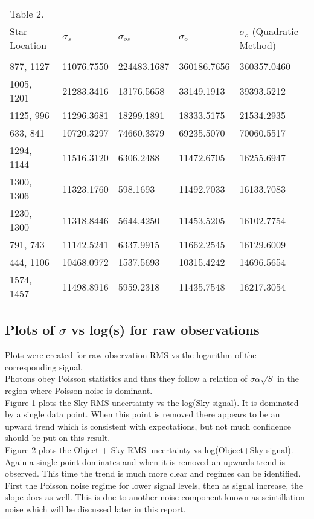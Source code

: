 \documentclass{article}
\begin{document}
\begin{table}[h]
\begin{tabular}{lllll}
Table 2. & & & &\\
Star Location & $\sigma _s$ & $\sigma _{os}$ & $\sigma _o$ & $\sigma _o$ (Quadratic Method) \\
\hline \\
877, 1127 & 11076.7550 & 224483.1687 & 360186.7656 & 360357.0460 \\
1005, 1201 & 21283.3416 & 13176.5658 & 33149.1913 & 39393.5212 \\
1125, 996 & 11296.3681 & 18299.1891 & 18333.5175 & 21534.2935 \\
633, 841 & 10720.3297 & 74660.3379 & 69235.5070 & 70060.5517 \\
1294, 1144 & 11516.3120 & 6306.2488 & 11472.6705 & 16255.6947 \\
1300, 1306 & 11323.1760 & 598.1693 & 11492.7033 & 16133.7083 \\
1230, 1300 & 11318.8446 & 5644.4250 & 11453.5205 & 16102.7754 \\
791, 743 & 11142.5241 & 6337.9915 & 11662.2545 & 16129.6009 \\
444, 1106 & 10468.0972 & 1537.5693 & 10315.4242 & 14696.5654 \\
1574, 1457 & 11498.8916 & 5959.2318 & 11435.7548 & 16217.3054 
\end{tabular}
\end{table}

\subsection{Plots of $\sigma$ vs log(s) for raw observations}
Plots were created for raw observation RMS vs the logarithm of the corresponding signal.\\

Photons obey Poisson statistics and thus they follow a relation of $\sigma \alpha \sqrt{S}$ in the region where Poisson noise is dominant.\\

Figure 1 plots the Sky RMS uncertainty vs the log(Sky signal). It is dominated by a single data point. When this point is removed there appears to be an upward trend which is consistent with expectations, but not much confidence should be put on this result.\\

Figure 2 plots the Object + Sky RMS uncertainty vs log(Object+Sky signal). Again a single point dominates and when it is removed an upwards trend is observed. This time the trend is much more clear and regimes can be identified. First the Poisson noise regime for lower signal levels, then as signal increase, the slope does as well. This is due to another noise component known as scintillation noise which will be discussed later in this report.\\
\end{document}
